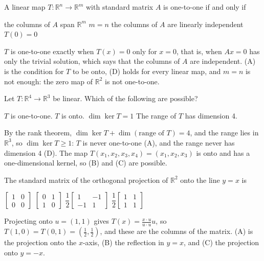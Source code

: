 \begin{question}[id=lt-12]
A linear map $T : \mathbb{R}^n \to \mathbb{R}^m$ with standard matrix $A$ is one-to-one if and only if
\begin{options}
  \option the columns of $A$ span $\mathbb{R}^m$
  \option $m = n$
  \correct the columns of $A$ are linearly independent
  \option $T(0) = 0$
\end{options}
\begin{solution}
$T$ is one-to-one exactly when $T(x) = 0$ only for $x = 0$, that is, when $Ax = 0$ has only the trivial solution, which says that the columns of $A$ are independent. (A) is the condition for $T$ to be onto, (D) holds for every linear map, and $m = n$ is not enough: the zero map of $\mathbb{R}^2$ is not one-to-one.
\end{solution}
\end{question}

\begin{question}[id=lt-13, type=msq, marks=2]
Let $T : \mathbb{R}^4 \to \mathbb{R}^3$ be linear. Which of the following are possible?
\begin{options}
  \option $T$ is one-to-one.
  \correct $T$ is onto.
  \correct $\dim \ker T = 1$
  \option The range of $T$ has dimension 4.
\end{options}
\begin{solution}
By the rank theorem, $\dim \ker T + \dim(\text{range of } T) = 4$, and the range lies in $\mathbb{R}^3$, so $\dim \ker T \ge 1$: $T$ is never one-to-one (A), and the range never has dimension 4 (D). The map $T(x_1, x_2, x_3, x_4) = (x_1, x_2, x_3)$ is onto and has a one-dimensional kernel, so (B) and (C) are possible.
\end{solution}
\end{question}

\begin{question}[id=lt-14]
The standard matrix of the orthogonal projection of $\mathbb{R}^2$ onto the line $y = x$ is
\begin{options}
  \option $\begin{bmatrix} 1 & 0 \\ 0 & 0 \end{bmatrix}$
  \option $\begin{bmatrix} 0 & 1 \\ 1 & 0 \end{bmatrix}$
  \option $\dfrac{1}{2}\begin{bmatrix} 1 & -1 \\ -1 & 1 \end{bmatrix}$
  \correct $\dfrac{1}{2}\begin{bmatrix} 1 & 1 \\ 1 & 1 \end{bmatrix}$
\end{options}
\begin{solution}
Projecting onto $u = (1, 1)$ gives $T(x) = \frac{x \cdot u}{u \cdot u}u$, so $T(1, 0) = T(0, 1) = (\tfrac{1}{2}, \tfrac{1}{2})$, and these are the columns of the matrix. (A) is the projection onto the $x$-axis, (B) the reflection in $y = x$, and (C) the projection onto $y = -x$.
\end{solution}
\end{question}

